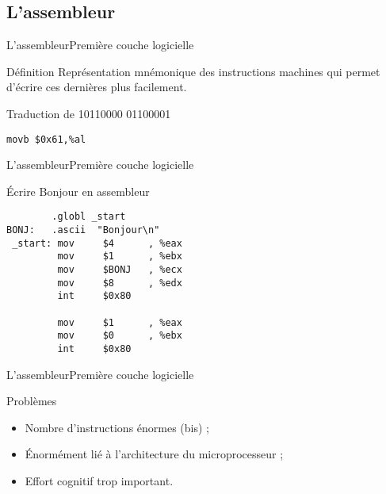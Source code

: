 \documentclass[notes]{beamer}
\newcommand{\ofgfr}[1]{\og{}#1\fg{}}
\begin{document}
\subsection{L'assembleur}

\begin{frame}[fragile]{L'assembleur}{Première couche logicielle}
    \begin{block}{Définition}
    Représentation mnémonique des instructions machines qui permet d'écrire ces
    dernières plus facilement.
    \end{block}
    \pause
    \begin{exampleblock}{Traduction de 10110000 01100001}
    \pause
    \begin{lstlisting}
movb $0x61,%al
    \end{lstlisting}
    \end{exampleblock}
\end{frame}

\begin{frame}[fragile]{L'assembleur}{Première couche logicielle}
    \pause
    \begin{exampleblock}{Écrire \ofgfr{Bonjour} en assembleur}
    \begin{lstlisting}
        .globl _start
BONJ:   .ascii  "Bonjour\n"
 _start: mov     $4      , %eax
         mov     $1      , %ebx
         mov     $BONJ   , %ecx
         mov     $8      , %edx
         int     $0x80

         mov     $1      , %eax
         mov     $0      , %ebx
         int     $0x80
    \end{lstlisting}
    \end{exampleblock}
\end{frame}

\begin{frame}[fragile]{L'assembleur}{Première couche logicielle}
    \begin{alertblock}{Problèmes}
    \pause
    \begin{itemize}[<+->]
    \item Nombre d'instructions énormes (bis) ;
    \item Énormément lié à l'architecture du microprocesseur ;
    \item Effort cognitif trop important.
    \end{itemize}
    \end{alertblock}
\end{frame}
\end{document}
